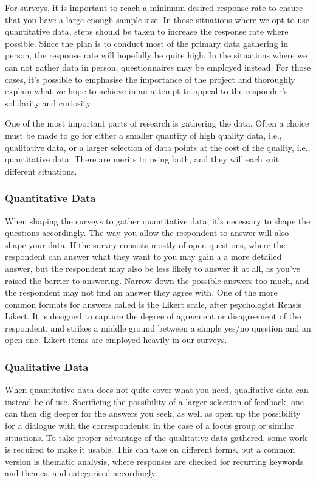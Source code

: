 For surveys, it is important to reach a minimum desired response rate to ensure that you have a large enough sample size. In those situations where we opt to use quantitative data, steps should be taken to increase the response rate where possible. Since the plan is to conduct most of the primary data gathering in person, the response rate will hopefully be quite high. In the situations where we can not gather data in person, questionnaires may be employed instead. For those cases, it's possible to emphasise the importance of the project and thoroughly explain what we hope to achieve in an attempt to appeal to the responder's solidarity and curiosity. 

One of the most important parts of research is gathering the data. Often a choice must be made to go for either a smaller quantity of high quality data, i.e., qualitative data, or a larger selection of data points at the cost of the quality, i.e., quantitative data. There are merits to using both, and they will each suit different situations.

\subsubsection{Quantitative Data}
When shaping the surveys to gather quantitative data, it's necessary to shape the questions accordingly. The way you allow the respondent to answer will also shape your data. If the survey consists mostly of open questions, where the respondent can answer what they want to you may gain a a more detailed answer, but the respondent may also be less likely to answer it at all, as you've raised the barrier to answering\citep[p.~223]{oates2005researching}. Narrow down the possible answers too much, and the respondent may not find an answer they agree with. One of the more common formats for answers called is the Likert scale, after psychologist Rensis Likert\cite{likert1932technique}. It is designed to capture the degree of agreement or disagreement of the respondent, and strikes a middle ground between a simple yes/no question and an open one. Likert items are employed heavily in our surveys.


\subsubsection{Qualitative Data}
When quantitative data does not quite cover what you need, qualitative data can instead be of use. Sacrificing the possibility of a larger selection of feedback, one can then dig deeper for the answers you seek, as well as open up the possibility for a dialogue with the correspondents, in the case of a focus group or similar situations. To take proper advantage of the qualitative data gathered, some work is required to make it usable. This can take on different forms, but a common version is thematic analysis, where responses are checked for recurring keywords and themes, and categorised accordingly.

